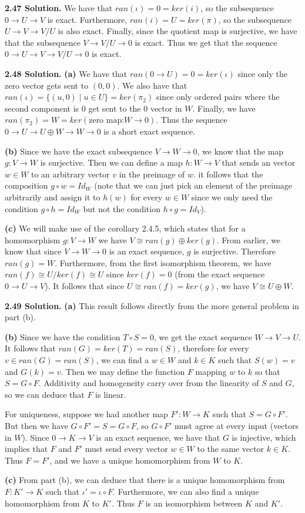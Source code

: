 \textbf{2.47 Solution.} We have that $ran(\iota) = 0 = ker(i)$, so the subsequence $0 \to U \to V$ is exact. Furthermore, $ran(i) = U = ker(\pi)$, so the subsequence $U \to V \to V/U$ is also exact. Finally, since the quotient map is surjective, we have that the subsequence $V \to V/U \to 0$ is exact. Thus we get that the sequence $0 \to U \to V \to V/U \to 0$ is exact.

\textbf{2.48 Solution.} \textbf{(a)} We have that $ran(0 \to U) = 0 = ker(\iota)$ since only the zero vector gets sent to $(0, 0)$. We also have that $ran(\iota) = \{(u,0) \mid u \in U\} = ker(\pi_2)$ since only ordered pairs where the second component is 0 get sent to the 0 vector in $W$. Finally, we have $ran(\pi_2) = W = ker(\text{zero map:}W \to 0)$. Thus the sequence $0 \to U \to U \oplus W \to W \to 0$ is a short exact sequence.

\textbf{(b)} Since we have the exact subsequence $V \to W \to 0$, we know that the map $g: V \to W$ is surjective. Then we can define a map $h: W \to V$ that sends an vector $w \in W$ to an arbitrary vector $v$ in the preimage of $w$. it follows that the composition $g \circ w = Id_W$ (note that we can just pick an element of the preimage arbitrarily and assign it to $h(w)$ for every $w \in W$ since we only need the condition $g \circ h = Id_W$ but not the condition $h \circ g = Id_V$).

\textbf{(c)} We will make use of the corollary 2.4.5, which states that for a homomorphism $g: V \to W$ we have $V \cong ran(g) \oplus ker(g)$. From earlier, we know that since $V \to W \to 0$ is an exact sequence, $g$ is surjective. Therefore $ran(g) = W$. Furthermore, from the first isomorphism theorem, we have $ran(f) \cong U / ker(f) \cong U$ since $ker(f) = 0$ (from the exact sequence $0 \to U \to V$). It follows that since $U \cong ran(f) = ker(g)$, we have $V \cong U \oplus W$.

\textbf{2.49 Solution.} \textbf{(a)} This result follows directly from the more general problem in part (b).

\textbf{(b)} Since we have the condition $T \circ S = 0$, we get the exact sequence $W \to V \to U$. It follows that $ran(G) = ker(T) = ran(S)$, therefore for every $v \in ran(G) = ran(S)$, we can find a $w \in W$ and $k \in K$ such that $S(w) = v$ and $G(k) = v$. Then we may define the function $F$ mapping $w$ to $k$ so that $S = G \circ F$. Additivity and homogeneity carry over from the linearity of $S$ and $G$, so we can deduce that $F$ is linear.

For uniqueness, suppose we had another map $F': W \to K$ such that $S = G \circ F'$. But then we have $G \circ F' = S = G \circ F$, so $G \circ F'$ must agree at every input (vectors in $W$). Since $0 \to K \to V$ is an exact sequence, we have that $G$ is injective, which implies that $F$ and $F'$ must send every vector $w \in W$ to the same vector $k \in K$. Thus $F = F'$, and we have a unique homomorphism from $W$ to $K$.

\textbf{(c)} From part (b), we can deduce that there is a unique homomorphism from $F: K' \to K$ such that $\iota' = \iota \circ F$. Furthermore, we can also find a unique homomorphism from $K$ to $K'$. Thus $F$ is an isomorphism between $K$ and $K'$.
